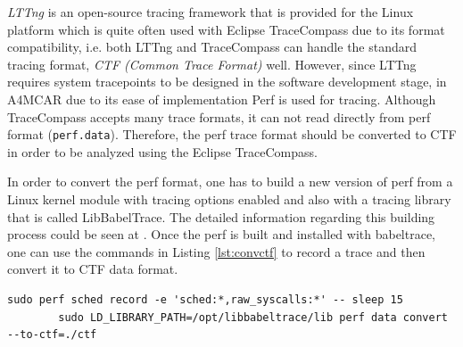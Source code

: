 \begin{itemize}
	\textit{LTTng} \cite{lttng} is an open-source tracing framework that is provided for the Linux platform which is quite often used with Eclipse TraceCompass due to its format compatibility, i.e. both LTTng and TraceCompass can handle the standard tracing format, \textit{CTF (Common Trace Format)} well. However, since LTTng requires system tracepoints to be designed in the software development stage, in A4MCAR due to its ease of implementation Perf is used for tracing. Although TraceCompass accepts many trace formats, it can not read directly from perf format (\texttt{perf.data}). Therefore, the perf trace format should be converted to CTF in order to be analyzed using the Eclipse TraceCompass.
	
	In order to convert the perf format, one has to build a new version of perf from a Linux kernel module \cite{jolsa} with tracing options enabled and also with a tracing library that is called LibBabelTrace. The detailed information regarding this building process could be seen at \cite{perfbabeltrace}. Once the perf is built and installed with babeltrace, one can use the commands in Listing \ref{lst:convctf} to record a trace and then convert it to CTF data format. 
	\begin{lstlisting}[caption={Conversion to Common Trace Format},label={lst:convctf},style=bash]
		sudo perf sched record -e 'sched:*,raw_syscalls:*' -- sleep 15
		sudo LD_LIBRARY_PATH=/opt/libbabeltrace/lib perf data convert --to-ctf=./ctf
	\end{lstlisting}
	

\end{itemize}
